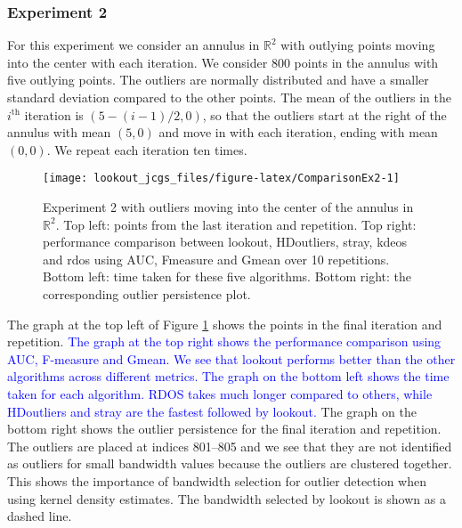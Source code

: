 \documentclass[12pt]{article}
\theoremstyle{definition}
\theoremstyle{definition}
\theoremstyle{definition}
\theoremstyle{definition}
\theoremstyle{remark}
\begin{document}
\hypertarget{experiment-2}{%
\subsubsection*{Experiment 2}\label{experiment-2}}

For this experiment we consider an annulus in \(\mathbb{R}^2\) with outlying points moving into the center with each iteration. We consider 800 points in the annulus with five outlying points. The outliers are normally distributed and have a smaller standard deviation compared to the other points. The mean of the outliers in the \(i^{\text{th}}\) iteration is \(\left(5 - (i-1) /2, 0 \right)\), so that the outliers start at the right of the annulus with mean \((5,0)\) and move in with each iteration, ending with mean \((0,0)\). We repeat each iteration ten times.

\begin{figure}[b]

{\centering \texttt{[image: lookout\_jcgs\_files/figure-latex/ComparisonEx2-1]} 

}

\caption{Experiment 2 with outliers moving into the center of the annulus in $\mathbb{R}^2$. Top left: points from the last iteration and repetition. Top right: performance comparison between lookout, HDoutliers, stray, kdeos and rdos using AUC, Fmeasure and Gmean over 10 repetitions. Bottom left: time taken for these five algorithms. Bottom right: the corresponding outlier persistence plot.}\label{fig:ComparisonEx2}
\end{figure}

The graph at the top left of Figure \ref{fig:ComparisonEx2} shows the points in the final iteration and repetition. \textcolor{blue}{ The graph at the top right shows the performance comparison using AUC, F-measure and Gmean. We see that lookout performs better than the other algorithms across different metrics. The graph on the bottom left shows the time taken for each algorithm. RDOS takes much longer compared to others, while HDoutliers and stray are the fastest followed by lookout.} The graph on the bottom right shows the outlier persistence for the final iteration and repetition. The outliers are placed at indices 801--805 and we see that they are not identified as outliers for small bandwidth values because the outliers are clustered together. This shows the importance of bandwidth selection for outlier detection when using kernel density estimates. The bandwidth selected by lookout is shown as a dashed line.
\end{document}
